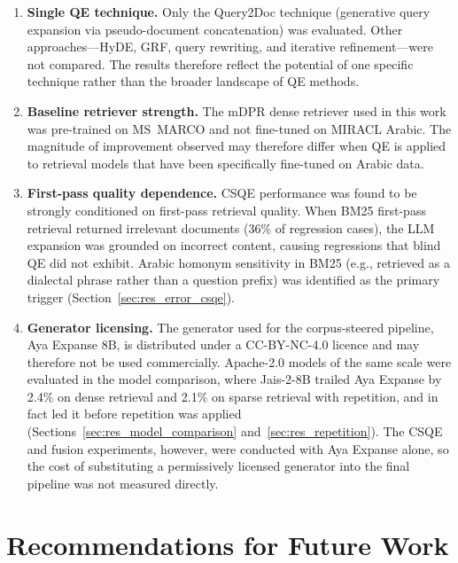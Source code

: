 \begin{enumerate}[label=\roman*.]
    \item \textbf{Single QE technique.} Only the Query2Doc technique (generative query expansion via pseudo-document concatenation) was evaluated. Other approaches---HyDE, GRF, query rewriting, and iterative refinement---were not compared. The results therefore reflect the potential of one specific technique rather than the broader landscape of QE methods.

    \item \textbf{Baseline retriever strength.} The mDPR dense retriever used in this work was pre-trained on MS~MARCO and not fine-tuned on MIRACL Arabic. The magnitude of improvement observed may therefore differ when QE is applied to retrieval models that have been specifically fine-tuned on Arabic data.

    \item \textbf{First-pass quality dependence.} CSQE performance was found to be strongly conditioned on first-pass retrieval quality. When BM25 first-pass retrieval returned irrelevant documents (36\% of regression cases), the LLM expansion was grounded on incorrect content, causing regressions that blind QE did not exhibit. Arabic homonym sensitivity in BM25 (e.g.,  retrieved as a dialectal phrase rather than a question prefix) was identified as the primary trigger (Section~\ref{sec:res_error_csqe}).

    \item \textbf{Generator licensing.} The generator used for the corpus-steered pipeline, Aya Expanse 8B, is distributed under a CC-BY-NC-4.0 licence and may therefore not be used commercially. Apache-2.0 models of the same scale were evaluated in the model comparison, where Jais-2-8B trailed Aya Expanse by 2.4\% on dense retrieval and 2.1\% on sparse retrieval with repetition, and in fact led it before repetition was applied (Sections~\ref{sec:res_model_comparison} and~\ref{sec:res_repetition}). The CSQE and fusion experiments, however, were conducted with Aya Expanse alone, so the cost of substituting a permissively licensed generator into the final pipeline was not measured directly.
\end{enumerate}

\section{Recommendations for Future Work}
\label{sec:recommendations}

